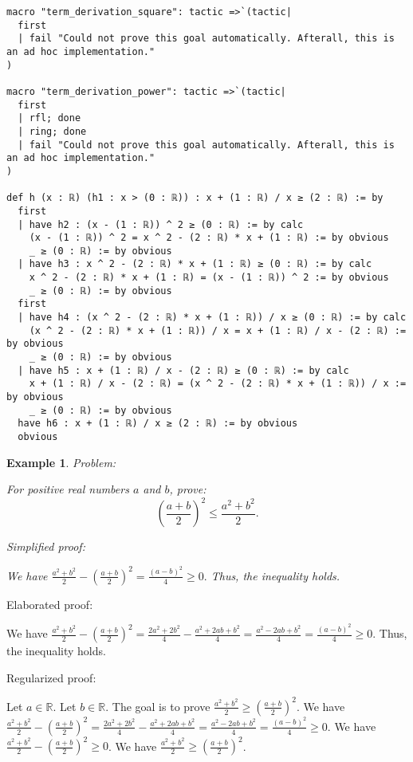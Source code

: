\documentclass{article}
\newtheorem{example}{Example}
\begin{document}
\begin{tcolorbox}[colback=white!10, width=\linewidth]
\begin{lstlisting}[language=Lean4]
macro "term_derivation_square": tactic =>`(tactic|
  first
  | fail "Could not prove this goal automatically. Afterall, this is an ad hoc implementation."
)

macro "term_derivation_power": tactic =>`(tactic|
  first
  | rfl; done
  | ring; done
  | fail "Could not prove this goal automatically. Afterall, this is an ad hoc implementation."
)

def h (x : ℝ) (h1 : x > (0 : ℝ)) : x + (1 : ℝ) / x ≥ (2 : ℝ) := by
  first
  | have h2 : (x - (1 : ℝ)) ^ 2 ≥ (0 : ℝ) := by calc
    (x - (1 : ℝ)) ^ 2 = x ^ 2 - (2 : ℝ) * x + (1 : ℝ) := by obvious
    _ ≥ (0 : ℝ) := by obvious
  | have h3 : x ^ 2 - (2 : ℝ) * x + (1 : ℝ) ≥ (0 : ℝ) := by calc
    x ^ 2 - (2 : ℝ) * x + (1 : ℝ) = (x - (1 : ℝ)) ^ 2 := by obvious
    _ ≥ (0 : ℝ) := by obvious
  first
  | have h4 : (x ^ 2 - (2 : ℝ) * x + (1 : ℝ)) / x ≥ (0 : ℝ) := by calc
    (x ^ 2 - (2 : ℝ) * x + (1 : ℝ)) / x = x + (1 : ℝ) / x - (2 : ℝ) := by obvious
    _ ≥ (0 : ℝ) := by obvious
  | have h5 : x + (1 : ℝ) / x - (2 : ℝ) ≥ (0 : ℝ) := by calc
    x + (1 : ℝ) / x - (2 : ℝ) = (x ^ 2 - (2 : ℝ) * x + (1 : ℝ)) / x := by obvious
    _ ≥ (0 : ℝ) := by obvious
  have h6 : x + (1 : ℝ) / x ≥ (2 : ℝ) := by obvious
  obvious

\end{lstlisting}
\end{tcolorbox}


\begin{example}
Problem:
\begin{tcolorbox}[colback=yellow!10, width=\linewidth]
For positive real numbers $a$ and $b$, prove:
    $$\left(\frac{a+b}{2}\right)^2 \leq \frac{a^2+b^2}{2}.$$
\end{tcolorbox}

Simplified proof:
\begin{tcolorbox}[colback=blue!10, width=\linewidth]
We have
$ \frac{a^2+b^2}{2} - \left(\frac{a+b}{2}\right)^2 = \frac{(a-b)^2}{4} \ge 0. $
Thus, the inequality holds.
\end{tcolorbox}
\end{example}

Elaborated proof:
\begin{tcolorbox}[colback=green!10, width=\linewidth]
We have
$ \frac{a^2+b^2}{2} - \left(\frac{a+b}{2}\right)^2 = \frac{2a^2+2b^2}{4} - \frac{a^2+2ab+b^2}{4} = \frac{a^2-2ab+b^2}{4} = \frac{(a-b)^2}{4} \ge 0. $
Thus, the inequality holds.
\end{tcolorbox}

Regularized proof:
\begin{tcolorbox}[colback=red!10, width=\linewidth]
Let $a\in\mathbb{R}$.
Let $b\in\mathbb{R}$.
The goal is to prove $\frac{a^2+b^2}{2} \ge {\left(\frac{a+b}{2}\right)}^2$.
We have $\frac{a^2+b^2}{2} - {\left(\frac{a+b}{2}\right)}^2 = \frac{2a^2+2b^2}{4} - \frac{a^2+2ab+b^2}{4} = \frac{a^2-2ab+b^2}{4} = \frac{{{(a-b)}}^2}{4} \ge 0$.
We have $\frac{a^2+b^2}{2} - {\left(\frac{a+b}{2}\right)}^2 \ge 0$.
We have $\frac{a^2+b^2}{2} \ge {\left(\frac{a+b}{2}\right)}^2$.
\end{tcolorbox}
\end{document}
